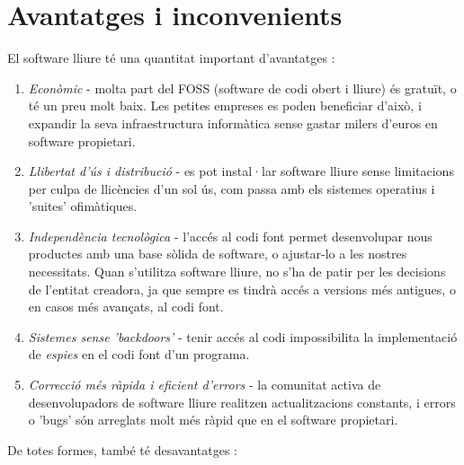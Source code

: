 \section{Avantatges i inconvenients}

El software lliure té una quantitat important d'avantatges  \cite{fossadvantages}:

\begin{enumerate}
\item \emph{Econòmic} - molta part del FOSS (software de codi obert i lliure) és gratuït, o té un preu molt baix. Les petites empreses es poden beneficiar d'això, i expandir la seva infraestructura informàtica sense gastar milers d'euros en software propietari.
\item \emph{Llibertat d'ús i distribució} - es pot instal·lar software lliure sense limitacions per culpa de llicències d'un sol ús, com passa amb els sistemes operatius i 'suites' ofimàtiques.
\item \emph{Independència tecnològica} - l'accés al codi font permet desenvolupar nous productes amb una base sòlida de software, o ajustar-lo a les nostres necessitats. Quan s'utilitza software lliure, no s'ha de patir per les decisions de l'entitat creadora, ja que sempre es tindrà accés a versions més antigues, o en casos més avançats, al codi font.
\item \emph{Sistemes sense 'backdoors'} - tenir accés al codi impossibilita la implementació de \emph{espies} en el codi font d'un programa.
\item \emph{Correcció més ràpida i eficient d'errors} - la comunitat activa de desenvolupadors de software lliure realitzen actualitzacions constants, i errors o 'bugs' són arreglats molt més ràpid que en el software propietari.
\end{enumerate}

De totes formes, també té desavantatges \cite{gentegeek}:

